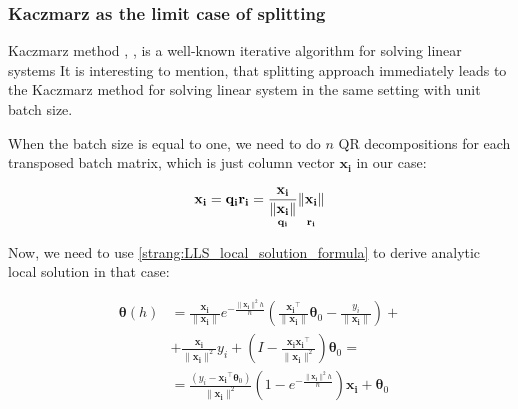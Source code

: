 \documentclass{article}
\newcommand{\vect}[1]{\boldsymbol{\mathbf{#1}}}
\begin{document}



\subsubsection{Kaczmarz as the limit case of splitting}
Kaczmarz method \cite{kaczmarz1937method}, \cite{strohmer2009randomized}, \cite{gower2015randomized} is a well-known iterative algorithm for solving linear systems
It is interesting to mention, that splitting approach immediately leads to the Kaczmarz method for solving linear system in the same setting with unit batch size.

When the batch size is equal to one, we need to do $n$ QR decompositions for each transposed batch matrix, which is just column vector $\vect{x_i}$ in our case:

\begin{equation}
\vect{x_i} = \vect{q_i} \vect{r_i} = \underset{\vect{q_i} }{\frac{\vect{x_i}}{\|\vect{x_i}\|}} \underset{\vect{r_i}}{\vphantom{\frac{\vect{x_i}}{\|\vect{x_i}\|}} \|\vect{x_i}\|}
\end{equation}

Now, we need to use \eqref{strang:LLS_local_solution_formula} to derive analytic local solution in that case:

\begin{equation*}
\begin{split}
\vect{\theta}(h) &= \frac{\vect{x_i}}{\|\vect{x_i}\|} e^{-\frac{\|\vect{x_i}\|^2 h}{n}} \left( \frac{\vect{x_i}^\top}{\|\vect{x_i}\|} \vect{\theta}_0 - \frac{y_i}{\|\vect{x_i}\|}\right) + \\ &+ \frac{\vect{x_i}}{\|\vect{x_i}\|^2}y_i + \left(I - \frac{\vect{x_i}\vect{x_i}^\top}{\|\vect{x_i}\|^2}\right)\vect{\theta}_0 = \\
&= \frac{\left(y_i -\vect{x_i}^\top\vect{\theta}_0 \right)}{\|\vect{x_i}\|^2}  \left(1 - e^{-\frac{\|\vect{x_i}\|^2 h}{n}}\right)\vect{x_i} + \vect{\theta}_0
\end{split}
\end{equation*}
\end{document}
